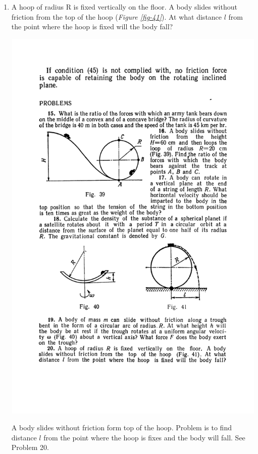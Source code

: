 \documentclass[a4paper,sfsidenotes]{tufte-book}
\begin{document}
\begin{enumerate}[resume*=problems]
\begin{marginfigure}[-6cm]
\caption{A body slides without friction on a uniformly rotating circular trough. Problem is to find the force the body exerts on the trough and the height at which the body will be at rest. See Problem 19.}
\label{fig-40}
\end{marginfigure}

\item A hoop of radius R is fixed vertically on the floor. A body slides without friction from the top of the hoop (\emph{Figure \ref{fig-41}}). At what distance $l$ from the point where the hoop is fixed will the body fall?
\begin{marginfigure}[1cm]
\centering
\includegraphics[width=\linewidth]{fig-041a.pdf}
\caption{A body slides without friction form top of the hoop. Problem is to find distance $l$ from the point where the hoop is fixes and the body will fall. See Problem 20.}
\label{fig-41}
\end{marginfigure}

\end{enumerate}
\end{document}
